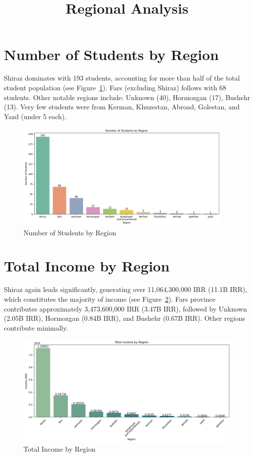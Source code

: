 \documentclass[12pt,a4paper]{article}
\title{Regional Analysis}
\date{}
\begin{document}
\maketitle

\section{Number of Students by Region}
Shiraz dominates with 193 students, accounting for more than half of the total student population (see Figure~\ref{fig:students-region}). Fars (excluding Shiraz) follows with 68 students. Other notable regions include: Unknown (40), Hormozgan (17), Bushehr (13). Very few students were from Kerman, Khuzestan, Abroad, Golestan, and Yazd (under 5 each).

\begin{figure}[h!]
    \centering
    \includegraphics[width=0.95\textwidth]{Number of Students by Region.png}
    \caption{Number of Students by Region}
    \label{fig:students-region}
\end{figure}

\section{Total Income by Region}
Shiraz again leads significantly, generating over 11,064,300,000 IRR (11.1B IRR), which constitutes the majority of income (see Figure~\ref{fig:income-region}). Fars province contributes approximately 3,473,600,000 IRR (3.47B IRR), followed by Unknown (2.05B IRR), Hormozgan (0.84B IRR), and Bushehr (0.67B IRR). Other regions contribute minimally.

\begin{figure}[h!]
    \centering
    \includegraphics[width=1\textwidth]{Total Income by Region.png}
    \caption{Total Income by Region}
    \label{fig:income-region}
\end{figure}
\end{document}
